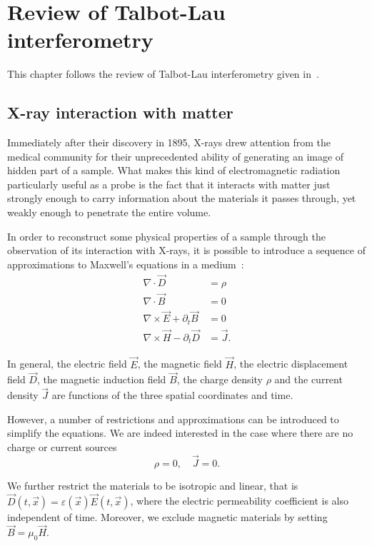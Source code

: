 \chapter{Review of Talbot-Lau interferometry}\label{ch:review}
This chapter follows the review of Talbot-Lau interferometry given in~\cite{galitesina}.

\section{X-ray interaction with matter}
Immediately after their discovery in 1895, X-rays drew attention from the
medical community for their unprecedented ability of generating an image of
hidden part of a sample. What makes this kind of electromagnetic radiation
particularly useful as a probe is the fact that it interacts with matter
just strongly enough to carry information about the materials it passes
through, yet weakly enough to penetrate the entire volume.

In order to reconstruct some physical properties of a sample through the
observation of its interaction with X-rays, it is possible to introduce a
sequence of approximations to Maxwell's equations in a medium~\cite{jackson_classical_1999, Paganin2006b}:
\begin{align}
    \nabla \cdot \vec{D} &= \rho \label{eq:gauss-original}\\
    \nabla \cdot \vec{B} &= 0 \label{eq:nomonopoles-original}\\
    \nabla \times \vec{E} + \partial_t \vec{B} &= 0
    \label{eq:induction-original}\\
    \nabla \times \vec{H} - \partial_t \vec{D} &= \vec{J}
    \label{eq:ampere-original}.
\end{align}

In general, the electric field $\vec{E}$, the magnetic field $\vec{H}$, the
electric displacement field $\vec{D}$, the magnetic induction field
$\vec{B}$, the charge density $\rho$ and the current density $\vec{J}$ are
functions of the three spatial coordinates and time. 

However, a number of restrictions and approximations can be introduced to
simplify the equations. We are indeed interested in the case where there are
no charge or current sources
\begin{equation}
    \rho = 0, \quad \vec{J} = 0.
    \label{eq:absentsources}
\end{equation}

We further restrict the materials to be isotropic and linear, that is
$\vec{D}(t, \vec{x}) = \varepsilon(\vec{x}) \vec{E}(t, \vec{x})$, where the
electric permeability coefficient is also independent of time. Moreover, we
exclude magnetic materials by setting $\vec{B} = \mu_0 \vec{H}$.

